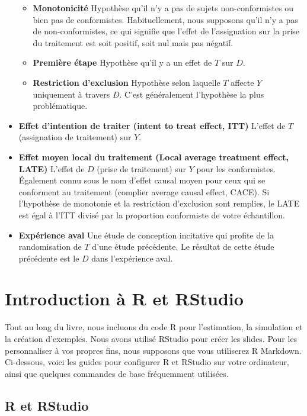 \documentclass[12pt,]{book}
\providecommand{\tightlist}{%
  \setlength{\itemsep}{0pt}\setlength{\parskip}{0pt}}
\begin{document}
\begin{itemize}
  \begin{itemize}
  \tightlist
  \item
    \textbf{Monotonicité} Hypothèse qu'il n'y a pas de sujets non-conformistes ou bien pas de conformistes.
    Habituellement, nous supposons qu'il n'y a pas de non-conformistes, ce qui signifie que l'effet de l'assignation sur la prise du traitement est soit positif, soit nul mais pas négatif.
  \item
    \textbf{Première étape} Hypothèse qu'il y a un effet de \(T\) sur \(D\).
  \item
    \textbf{Restriction d'exclusion} Hypothèse selon laquelle \(T\) affecte \(Y\) uniquement à travers \(D\). C'est généralement l'hypothèse la plus problématique.
  \end{itemize}
\item
  \textbf{Effet d'intention de traiter (intent to treat effect, ITT)} L'effet de \(T\) (assignation de traitement) sur \(Y\).
\item
  \textbf{Effet moyen local du traitement (Local average treatment effect, LATE)} L'effet de \(D\) (prise de traitement) sur \(Y\) pour les conformistes.
  Également connu sous le nom d'effet causal moyen pour ceux qui se conforment au traitement (complier average causal effect, CACE).
  Si l'hypothèse de monotonie et la restriction d'exclusion sont remplies, le LATE est égal à l'ITT divisé par la proportion conformiste de votre échantillon.
\item
  \textbf{Expérience aval} Une étude de conception incitative qui profite de la randomisation de \(T\) d'une étude précédente.
  Le résultat de cette étude précédente est le \(D\) dans l'expérience aval.
\end{itemize}

\hypertarget{introduction-uxe0-r-et-rstudio}{%
\chapter{Introduction à R et RStudio}\label{introduction-uxe0-r-et-rstudio}}

Tout au long du livre, nous incluons du code R pour l'estimation, la simulation et la création d'exemples. Nous avons utilisé RStudio pour créer les slides. Pour les personnaliser à vos propres fins, nous supposons que vous utiliserez R Markdown. Ci-dessous, voici les guides pour configurer R et RStudio sur votre ordinateur, ainsi que quelques commandes de base fréquemment utilisées.

\hypertarget{r-et-rstudio}{%
\section{R et RStudio}\label{r-et-rstudio}}
\end{document}
